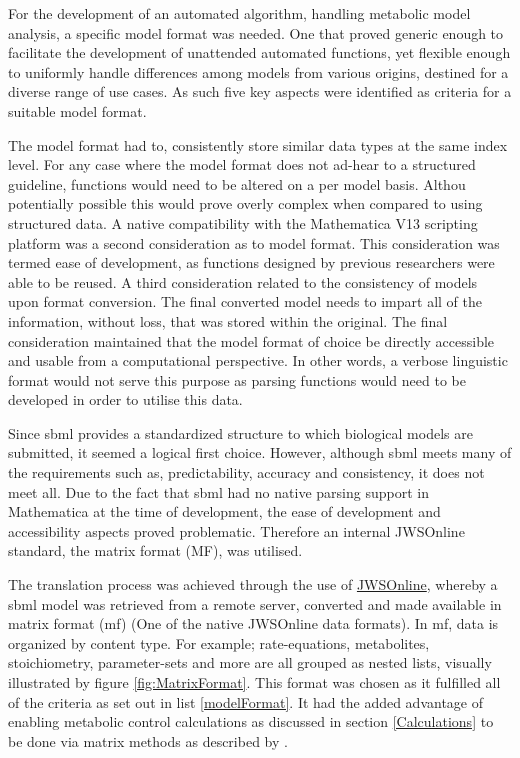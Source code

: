 For the development of an automated algorithm, handling metabolic model analysis, a specific model format was needed. One that proved generic enough to facilitate the development of unattended automated functions, yet flexible enough to uniformly handle differences among models from various origins, destined for a diverse range of use cases. As such five key aspects were identified as criteria for a suitable model format.

The model format had to, consistently store similar data types at the same index level. For any case where the model format does not ad-hear to a structured guideline, functions would need to be altered on a per model basis. Althou potentially possible this would prove overly complex when compared to using structured data. A native compatibility with the Mathematica V13 scripting platform was a second consideration as to model format. This consideration was termed ease of development, as functions designed by previous researchers were able to be reused. A third consideration related to the consistency of models upon format conversion. The final converted model needs to impart all of the information, without loss, that was stored within the original. The final consideration maintained that the model format of choice be directly accessible and usable from a computational perspective. In other words, a verbose linguistic format would not serve this purpose as parsing functions would need to be developed in order to utilise this data.

Since \gls{sbml} provides a standardized structure to which biological models are submitted, it seemed a logical first choice. However, although \gls{sbml} meets many of the requirements such as, predictability, accuracy and consistency, it does not meet all. Due to the fact that \gls{sbml} had no native parsing support in Mathematica at the time of development, the ease of development and accessibility aspects proved problematic. Therefore an internal JWSOnline standard, the matrix format (MF), was utilised. 

The translation process was achieved through the use of \href{https://jjj.bio.vu.nl}{JWSOnline}, whereby a \gls{sbml} model was retrieved from a remote server, converted and made available in matrix format (\gls{mf}) (One of the native JWSOnline data formats). In \gls{mf}, data is organized by content type. For example; rate-equations, metabolites, stoichiometry, parameter-sets and more are all grouped as nested lists, visually illustrated by figure \ref{fig:MatrixFormat}.  This format was chosen as it fulfilled all of the criteria as set out in list \ref{modelFormat}. It had the added advantage of enabling metabolic control calculations as discussed in section \ref{Calculations} to be done via matrix methods as described by \citeauthor{Hofmeyr2001}.

